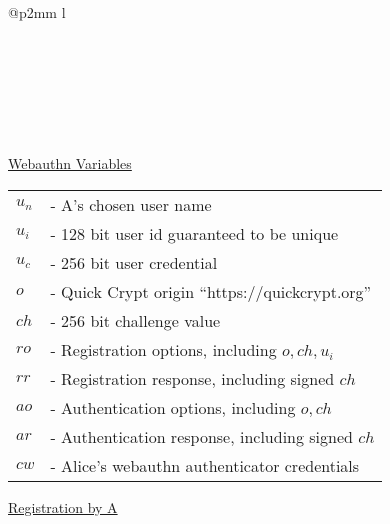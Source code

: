 \documentclass{article}
\begin{document}
\begin{tabular}{@{}p{2mm} l}
\\
\\
\\
\\
\\
\\
\\
\end{tabular}

\newpage

\underline{Webauthn Variables}\\

\begin{tabular}{@{}p{2mm} l}
$u_n$ & \textrm{ - A's chosen user name} \\
$u_i$ & \textrm{ - 128 bit user id guaranteed to be unique} \\
$u_c$ & \textrm{ - 256 bit user credential}\\
$o$ & \textrm{ - Quick Crypt origin ``https://quickcrypt.org''} \\
$ch$ & \textrm{ - 256 bit challenge value} \\
$ro$ & \textrm{ - Registration options, including }$o, ch, u_i$\\
$rr$ & \textrm{ - Registration response, including signed }$ch$\\
$ao$ & \textrm{ - Authentication options, including }$o, ch$\\
$ar$ & \textrm{ - Authentication response, including signed }$ch$\\
$cw$ & \textrm{ - Alice's webauthn authenticator credentials} \\
\end{tabular}

\hfill \break

\underline{Registration by A}\\
\end{document}
